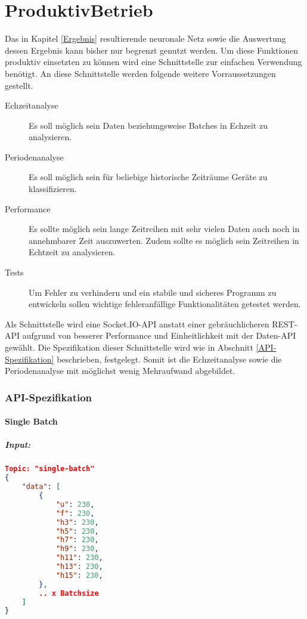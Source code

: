 \chapter{ProduktivBetrieb}
    Das in Kapitel \ref{Ergebnis} resultierende neuronale Netz sowie die Auswertung dessen Ergebnis kann bisher nur begrenzt genutzt werden.
    Um diese Funktionen produktiv einsetzten zu können wird eine Schnittstelle zur einfachen Verwendung benötigt.
    An diese Schnittstelle werden folgende weitere Vorraussetzungen gestellt.
    \begin{description}
        \item[Echzeitanalyse] Es soll möglich sein Daten beziehungsweise Batches in Echzeit zu analysieren.
        \item[Periodenanalyse] Es soll möglich sein für beliebige historische Zeiträume Geräte zu klassifizieren.
        \item[Performance] Es sollte möglich sein lange Zeitreihen mit sehr vielen Daten auch noch in annehmbarer Zeit auszuwerten. Zudem sollte es möglich sein Zeitreihen in Echtzeit zu analysieren.
        \item[Tests] Um Fehler zu verhindern und ein stabile und sicheres Programm zu entwickeln sollen wichtige fehleranfällige Funktionalitäten getestet werden.
    \end{description}


    Als Schnittstelle wird eine Socket.IO-API anstatt einer gebräuchlicheren REST-API aufgrund von besserer Performance und Einheitlichkeit mit der Daten-API gewählt.
    Die Spezifikation dieser Schnittstelle wird wie in Abschnitt \ref{API-Spezifikation} beschrieben, festgelegt. 
    Somit ist die Echzeitanalyse sowie die Periodenanalyse mit möglichst wenig Mehraufwand abgebildet.

    \subsection{API-Spezifikation}
        \subsubsection{Single Batch}
        \paragraph{Input:}

            \begin{lstlisting}[language=json,firstnumber=1]
Topic: "single-batch"
{
    "data": [
        {
            "u": 230,
            "f": 230,
            "h3": 230,
            "h5": 230,
            "h7": 230,
            "h9": 230,
            "h11": 230,
            "h13": 230,
            "h15": 230,
        },
        .. x Batchsize
    ]
}
            \end{lstlisting}
        
